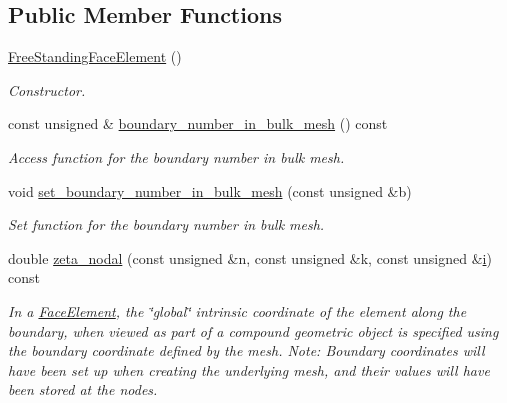 \subsection*{Public Member Functions}
\begin{DoxyCompactItemize}
\item 
\hyperlink{classoomph_1_1FreeStandingFaceElement_a9d87193db8d21a358eb6a0aa9881b90a}{Free\+Standing\+Face\+Element} ()
\begin{DoxyCompactList}\small\item\em Constructor. \end{DoxyCompactList}\item 
const unsigned \& \hyperlink{classoomph_1_1FreeStandingFaceElement_a6aeae669dbdc951e7df21422e693c991}{boundary\+\_\+number\+\_\+in\+\_\+bulk\+\_\+mesh} () const
\begin{DoxyCompactList}\small\item\em Access function for the boundary number in bulk mesh. \end{DoxyCompactList}\item 
void \hyperlink{classoomph_1_1FreeStandingFaceElement_a6b91f7a2dfd03a0df308ab3d8730d7db}{set\+\_\+boundary\+\_\+number\+\_\+in\+\_\+bulk\+\_\+mesh} (const unsigned \&b)
\begin{DoxyCompactList}\small\item\em Set function for the boundary number in bulk mesh. \end{DoxyCompactList}\item 
double \hyperlink{classoomph_1_1FreeStandingFaceElement_ad566632e00ef3ad2d02d824e63a3dc0e}{zeta\+\_\+nodal} (const unsigned \&n, const unsigned \&k, const unsigned \&\hyperlink{cfortran_8h_adb50e893b86b3e55e751a42eab3cba82}{i}) const
\begin{DoxyCompactList}\small\item\em In a \hyperlink{classoomph_1_1FaceElement}{Face\+Element}, the \char`\"{}global\char`\"{} intrinsic coordinate of the element along the boundary, when viewed as part of a compound geometric object is specified using the boundary coordinate defined by the mesh. Note\+: Boundary coordinates will have been set up when creating the underlying mesh, and their values will have been stored at the nodes. \end{DoxyCompactList}\end{DoxyCompactItemize}
